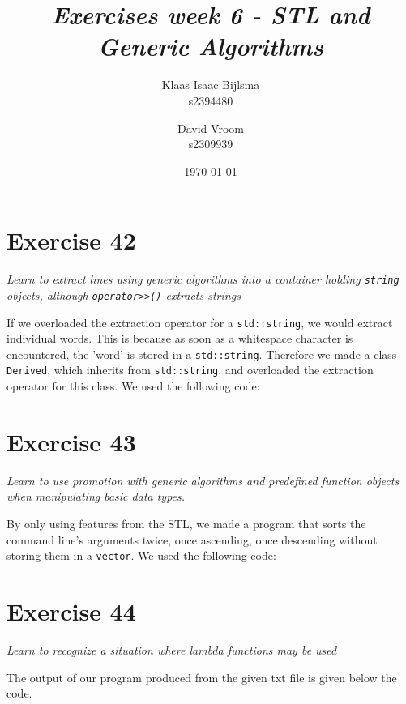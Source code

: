 \documentclass[12pt]{article}
\title{\itshape Exercises week 6 - STL and Generic Algorithms}
\author{
	Klaas Isaac Bijlsma \\ s2394480
	\and
	David Vroom \\ s2309939
}
\date{\today}
\newcommand{\desc}[1]{\textit{#1} \vspace{1em}}
\begin{document}
\maketitle

\section*{Exercise 42}
\desc{Learn to extract lines using generic algorithms into a container holding \texttt{string} objects, although \texttt{operator>>()} extracts strings}

If we overloaded the extraction operator for a \texttt{std::string}, we would extract individual words. This is because as soon as a whitespace character is encountered, the 'word' is stored in a \texttt{std::string}. Therefore we made a class \texttt{Derived}, which inherits from \texttt{std::string}, and overloaded the extraction operator for this class. We used the following code:


\clearpage

\section*{Exercise 43}
\desc{Learn to use promotion with generic algorithms and predefined function objects when manipulating basic data types.}

By only using features from the STL, we made a program that sorts the command line's arguments twice, once ascending, once descending without storing them in a \texttt{vector}. We used the following code:



\clearpage

\section*{Exercise 44}
\desc{Learn to recognize a situation where lambda functions may be used}

The output of our program produced from the given txt file is given below the code.










\end{document}
